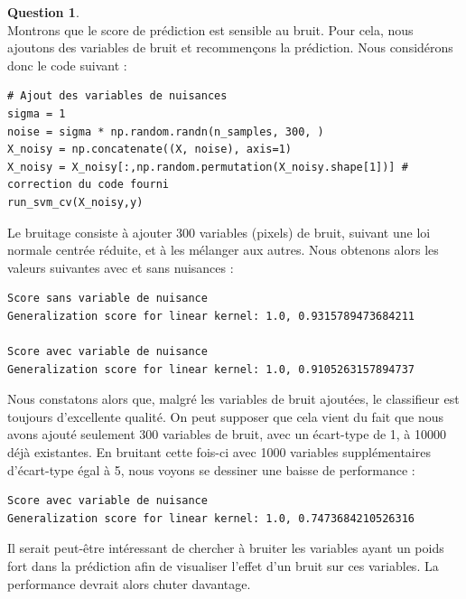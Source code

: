 \documentclass[11pt,a4paper]{article}
\theoremstyle{definition}
\newtheorem{Qu}{Question}
\begin{document}
\begin{Qu}~\\

Montrons que le score de prédiction est sensible au bruit. Pour cela, nous ajoutons des variables de bruit et recommençons la prédiction. 
Nous considérons donc le code suivant : 

\begin{verbatim}
# Ajout des variables de nuisances
sigma = 1
noise = sigma * np.random.randn(n_samples, 300, )
X_noisy = np.concatenate((X, noise), axis=1)
X_noisy = X_noisy[:,np.random.permutation(X_noisy.shape[1])] # correction du code fourni
run_svm_cv(X_noisy,y)
\end{verbatim}

Le bruitage consiste à ajouter 300 variables (pixels) de bruit, suivant une loi normale centrée réduite, et à les mélanger aux autres. Nous obtenons alors les valeurs suivantes avec et sans nuisances :

\begin{verbatim}
Score sans variable de nuisance
Generalization score for linear kernel: 1.0, 0.9315789473684211

Score avec variable de nuisance
Generalization score for linear kernel: 1.0, 0.9105263157894737
\end{verbatim}


Nous constatons alors que, malgré les variables de bruit ajoutées, le classifieur est toujours d'excellente qualité. On peut supposer que cela vient du fait que nous avons ajouté seulement 300 variables de bruit, avec un écart-type de 1, à 10000 déjà existantes. 
En bruitant cette fois-ci avec 1000 variables supplémentaires d'écart-type égal à 5, nous voyons se dessiner une baisse de performance :

\begin{verbatim}
Score avec variable de nuisance
Generalization score for linear kernel: 1.0, 0.7473684210526316 
\end{verbatim}

Il serait peut-être intéressant de chercher à bruiter les variables ayant un poids fort dans la prédiction afin de visualiser l'effet d'un bruit sur ces variables. La performance devrait alors chuter davantage. 



\end{Qu}

\
\end{document}

